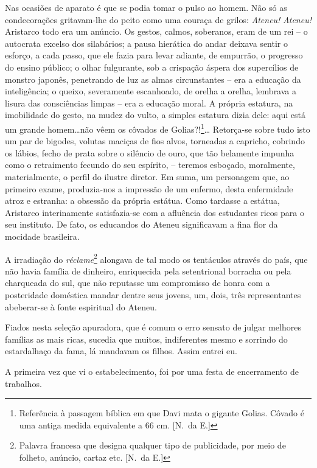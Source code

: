 Nas ocasiões de aparato é que se podia tomar o pulso ao homem. 
Não só as condecorações
gritavam{}-lhe do peito como uma couraça de grilos: \textit{Ateneu!} \textit{Ateneu!}
Aristarco todo era um anúncio. Os gestos, calmos, soberanos, eram de um
rei -- o autocrata excelso dos silabários; a pausa hierática do andar
deixava sentir o esforço, a cada passo, que ele fazia para levar
adiante, de empurrão, o progresso do ensino público; o olhar
fulgurante, sob a crispação áspera dos supercílios de monstro japonês,
penetrando de luz as almas circunstantes -- era a educação da
inteligência; o queixo, severamente escanhoado, de orelha a orelha,
lembrava a lisura das consciências limpas -- era a educação moral. A
própria estatura, na imobilidade do gesto, na mudez do vulto, a simples
estatura dizia dele: aqui está um grande homem\ldots não vêem os 
côvados de Golias?!\footnote{ Referência à passagem bíblica em que Davi mata o gigante Golias. 
Côvado é uma antiga medida equivalente a 66 cm. [N.~da E.]}\ldots 
Retorça{}-se sobre tudo isto um par de 
bigodes, volutas maciças de fios alvos, torneadas a capricho, cobrindo os lábios, fecho
de prata sobre o silêncio de ouro, que tão belamente impunha como o
retraimento fecundo do seu espírito, -- teremos esboçado, moralmente,
materialmente, o perfil do ilustre diretor. Em suma, um personagem que,
ao primeiro exame, produzia{}-nos a impressão de um enfermo, desta
enfermidade atroz e estranha: a obsessão da própria estátua. Como
tardasse a estátua, Aristarco interinamente satisfazia{}-se com a
afluência dos estudantes ricos para o seu instituto. De fato, os
educandos do Ateneu significavam a fina flor da mocidade brasileira. 

A irradiação do \textit{réclame}\footnote{ Palavra francesa que designa 
qualquer tipo de publicidade, por meio de folheto, anúncio, cartaz etc. 
[N.~da E.]} alongava de tal modo os tentáculos através do
país, que não havia família de dinheiro, enriquecida pela setentrional
borracha ou pela charqueada do sul, que não reputasse um compromisso de
honra com a posteridade doméstica mandar dentre seus jovens, um, dois,
três representantes abeberar{}-se à fonte espiritual do Ateneu. 

Fiados nesta seleção apuradora, que é comum o erro sensato de julgar melhores
famílias as mais ricas, sucedia que muitos, indiferentes mesmo e
sorrindo do estardalhaço da fama, lá mandavam os filhos. Assim entrei eu. 

A primeira vez que vi o estabelecimento, foi por uma festa de
encerramento de trabalhos. 

